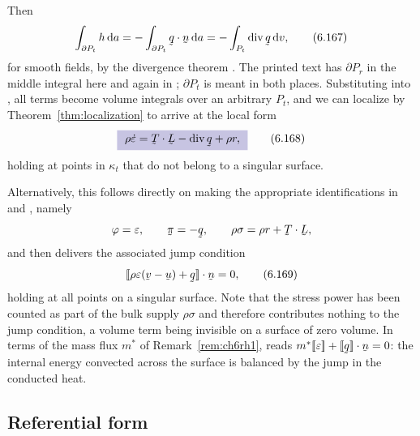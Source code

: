 Then
\begin{equation}
   \int_{\partial P_{t}}h\,\dl a=-\int_{\partial P_{t}}\ip\bq\bn\,\dl a
   =-\int_{P_{t}}\dvg\bq\,\dl v ,
   \tag{6.167}\label{eq:6.167}
\end{equation}
for smooth fields, by the divergence theorem . The printed
text has $\partial P_{r}$ in the middle integral here and again in
; $\partial P_{t}$ is meant in both places. Substituting
 into , all terms become volume integrals over an
arbitrary $P_{t}$, and we can localize by
Theorem~\ref{thm:localization} to arrive at the local form
\begin{equation}
   \boxed{\ \rho\dot\eps=\bT\cdot\bL-\dvg\bq+\rho r ,\ }
   \tag{6.168}\label{eq:6.168}
\end{equation}
holding at points in $\kappa_{t}$ that do not belong to a singular
surface.


Alternatively, this follows directly on making the appropriate
identifications in  and , namely
\[
   \varphi=\eps,\qquad \vek\pi=-\bq,\qquad
   \rho\sigma=\rho r+\bT\cdot\bL ,
\]
and  then delivers the associated jump condition
\begin{equation}
   \ip{\jump{\rho\eps(\bv-\bu)+\bq}}\bn=0 ,
   \tag{6.169}\label{eq:6.169}
\end{equation}
holding at all points on a singular surface. Note that the stress power
has been counted as part of the bulk supply $\rho\sigma$ and therefore
contributes nothing to the jump condition, a volume term being
invisible on a surface of zero volume. In terms of the mass flux
$m^{*}$ of Remark~\ref{rem:ch6rh1},  reads
$m^{*}\jump\eps+\ip{\jump\bq}\bn=0$: the internal energy convected
across the surface is balanced by the jump in the conducted heat.


\subsection*{Referential form}

